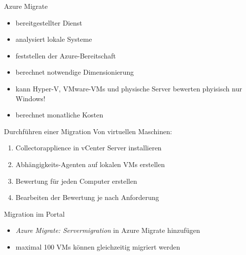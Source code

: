 
\begin{flashcard}[Definition]{Azure Migrate}
    \begin{itemize}
        \item bereitgestellter Dienst
        \item analysiert lokale Systeme
        \item feststellen der Azure-Bereitschaft
        \item berechnet notwendige Dimensionierung
        \item kann Hyper-V, VMware-VMs und physische Server bewerten\newline
            phyisisch nur Windows!
        \item berechnet monatliche Kosten
    \end{itemize}
\end{flashcard}

\begin{flashcard}[Definition]{Durchführen einer Migration}
    Von virtuellen Maschinen:
    \begin{enumerate}
        \item Collectorapplience in vCenter Server installieren
        \item Abhängigkeits-Agenten auf lokalen VMs erstellen
        \item Bewertung für jeden Computer erstellen
        \item Bearbeiten der Bewertung je nach Anforderung
    \end{enumerate}
\end{flashcard}

\begin{flashcard}[Definition]{Migration im Portal}
    \begin{itemize}
        \item \emph{Azure Migrate: Servermigration} in Azure Migrate hinzufügen
        \item maximal 100 VMs können gleichzeitig migriert werden
    \end{itemize}
\end{flashcard}

